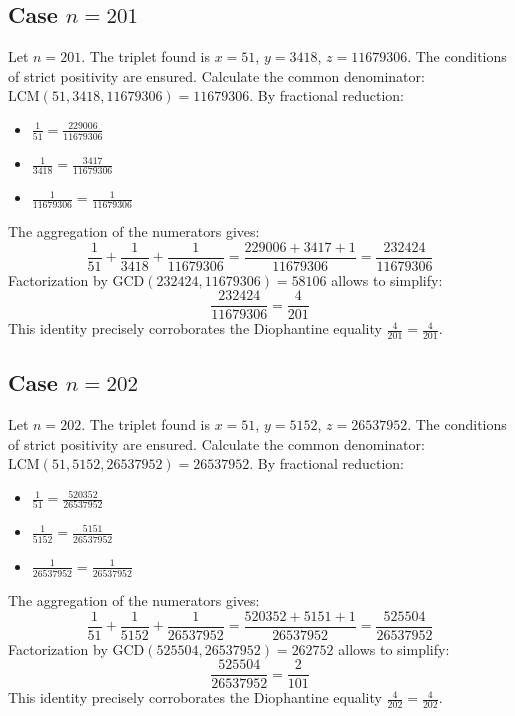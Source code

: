 \documentclass[11pt,a4paper]{article}
\begin{document}
\subsection{Case $n = 201$}
Let $n = 201$. The triplet found is $x = 51$, $y = 3418$, $z = 11679306$.
The conditions of strict positivity are ensured.
Calculate the common denominator: $\text{LCM}(51, 3418, 11679306) = 11679306$.
By fractional reduction:
\begin{itemize}
    \item $\frac{1}{51} = \frac{229006}{11679306}$
    \item $\frac{1}{3418} = \frac{3417}{11679306}$
    \item $\frac{1}{11679306} = \frac{1}{11679306}$
\end{itemize}
The aggregation of the numerators gives:
$$ \frac{1}{51} + \frac{1}{3418} + \frac{1}{11679306} = \frac{229006 + 3417 + 1}{11679306} = \frac{232424}{11679306} $$
Factorization by $\text{GCD}(232424, 11679306) = 58106$ allows to simplify:
$$ \frac{232424}{11679306} = \frac{4}{201} $$
This identity precisely corroborates the Diophantine equality $\frac{4}{201} = \frac{4}{201}$.

\subsection{Case $n = 202$}
Let $n = 202$. The triplet found is $x = 51$, $y = 5152$, $z = 26537952$.
The conditions of strict positivity are ensured.
Calculate the common denominator: $\text{LCM}(51, 5152, 26537952) = 26537952$.
By fractional reduction:
\begin{itemize}
    \item $\frac{1}{51} = \frac{520352}{26537952}$
    \item $\frac{1}{5152} = \frac{5151}{26537952}$
    \item $\frac{1}{26537952} = \frac{1}{26537952}$
\end{itemize}
The aggregation of the numerators gives:
$$ \frac{1}{51} + \frac{1}{5152} + \frac{1}{26537952} = \frac{520352 + 5151 + 1}{26537952} = \frac{525504}{26537952} $$
Factorization by $\text{GCD}(525504, 26537952) = 262752$ allows to simplify:
$$ \frac{525504}{26537952} = \frac{2}{101} $$
This identity precisely corroborates the Diophantine equality $\frac{4}{202} = \frac{4}{202}$.
\end{document}
